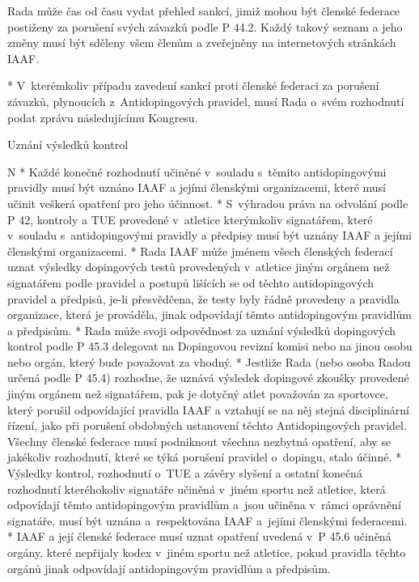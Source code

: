  Rada může čas od času vydat přehled sankcí, jimiž mohou být členské federace postiženy za porušení svých závazků podle P 44.2. Každý takový seznam a jeho změny musí být sděleny všem členům a zveřejněny na internetových stránkách IAAF.

* V~kterémkoliv případu zavedení sankcí proti členské federaci za porušení závazků, plynoucích z~Antidopingových pravidel, musí Rada o~svém rozhodnutí podat zprávu následujícímu Kongresu.
\enditems

\secc Uznání výsledků kontrol

\begitems \style N
* Každé konečné rozhodnutí učiněné v~souladu s~těmito antidopingovými pravidly musí být uznáno IAAF a jejími členskými organizacemi, které musí učinit veškerá opatření pro jeho účinnost.
* S~výhradou práva na odvolání podle P 42, kontroly a TUE provedené v~atletice kterýmkoliv signatářem, které v~souladu s~antidopingovými pravidly a předpisy musí být uznány IAAF a jejími členskými organizacemi.
* Rada IAAF může jménem všech členských federací uznat výsledky dopingových testů provedených v~atletice jiným orgánem než signatářem podle pravidel a postupů lišících se od těchto antidopingových pravidel a předpisů, je-li přesvědčena, že testy byly řádně provedeny a pravidla organizace, která je prováděla, jinak odpovídají těmto antidopingovým pravidlům a předpisům.
* Rada může svoji odpovědnost za uznání výsledků dopingových kontrol podle P 45.3 delegovat na Dopingovou revizní komisi nebo na jinou osobu nebo orgán, který bude považovat za vhodný.
* Jestliže Rada (nebo osoba Radou určená podle P 45.4) rozhodne, že uznává výsledek dopingové zkoušky provedené jiným orgánem než signatářem, pak je dotyčný atlet považován za sportovce, který porušil odpovídající pravidla IAAF a vztahují se na něj stejná disciplinární řízení, jako při porušení obdobných ustanovení těchto Antidopingových pravidel. Všechny členské federace musí podniknout všechna nezbytná opatření, aby se jakékoliv rozhodnutí, které se týká porušení pravidel o~dopingu, stalo účinné.
* Výsledky kontrol, rozhodnutí o~TUE a závěry slyšení a ostatní konečná rozhodnutí kteréhokoliv signatáře učiněná v~jiném sportu než atletice, která odpovídají těmto antidopingovým pravidlům a~jsou učiněna v~rámci oprávnění signatáře, musí být uznána a~respektována IAAF a~jejími členskými federacemi.
* IAAF a její členské federace musí uznat opatření uvedená v~P 45.6 učiněná orgány, které nepřijaly kodex v~jiném sportu než atletice, pokud pravidla těchto orgánů jinak odpovídají antidopingovým pravidlům a předpisům.
\enditems


